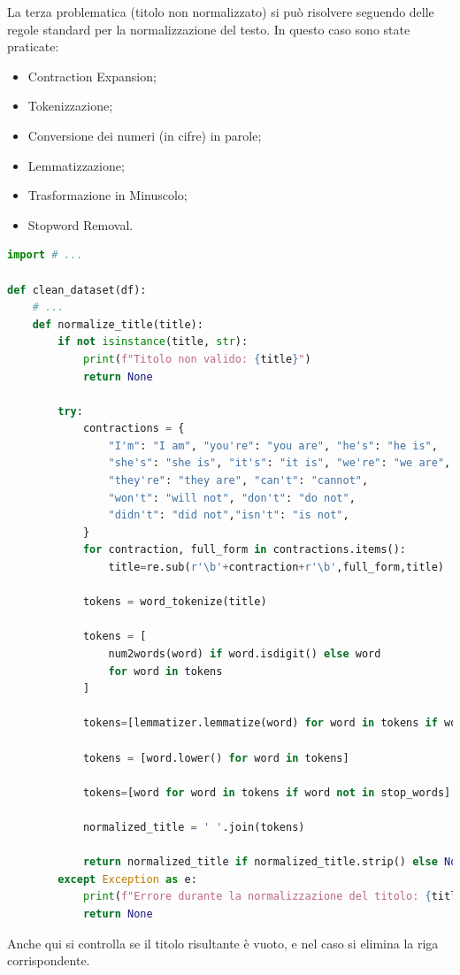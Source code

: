 \documentclass[a4paper,12pt]{report}
\begin{document}
La terza problematica (titolo non normalizzato) si può risolvere seguendo delle regole standard per la normalizzazione del testo. In questo caso sono state praticate:
\begin{itemize}
        \item Contraction Expansion;
        \item Tokenizzazione;
        \item Conversione dei numeri (in cifre) in parole;
        \item Lemmatizzazione;
        \item Trasformazione in Minuscolo;
        \item Stopword Removal.
\end{itemize}
\begin{lstlisting}[language=Python]
import # ...

def clean_dataset(df):
    # ...
    def normalize_title(title):
        if not isinstance(title, str):
            print(f"Titolo non valido: {title}")
            return None

        try:
            contractions = {
                "I'm": "I am", "you're": "you are", "he's": "he is",
                "she's": "she is", "it's": "it is", "we're": "we are",
                "they're": "they are", "can't": "cannot",
                "won't": "will not", "don't": "do not",
                "didn't": "did not","isn't": "is not",
            }
            for contraction, full_form in contractions.items():
                title=re.sub(r'\b'+contraction+r'\b',full_form,title)

            tokens = word_tokenize(title)

            tokens = [
                num2words(word) if word.isdigit() else word
                for word in tokens
            ]

            tokens=[lemmatizer.lemmatize(word) for word in tokens if word]

            tokens = [word.lower() for word in tokens]

            tokens=[word for word in tokens if word not in stop_words]

            normalized_title = ' '.join(tokens)

            return normalized_title if normalized_title.strip() else None
        except Exception as e:
            print(f"Errore durante la normalizzazione del titolo: {title}. Errore: {e}")
            return None
\end{lstlisting}
Anche qui si controlla se il titolo risultante è vuoto, e nel caso si elimina la riga corrispondente.
\end{document}
